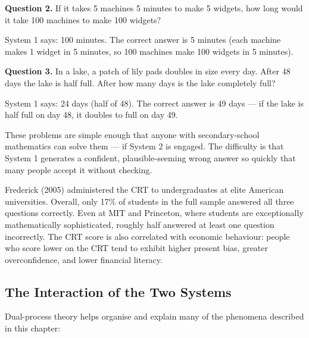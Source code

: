 \documentclass[12pt, letterpaper]{article}
\begin{document}
\textbf{Question 2.} If it takes 5 machines 5 minutes to make 5 widgets, how long would it take 100 machines to make 100 widgets?

System 1 says: 100 minutes. The correct answer is 5 minutes (each machine makes 1 widget in 5 minutes, so 100 machines make 100 widgets in 5 minutes).

\textbf{Question 3.} In a lake, a patch of lily pads doubles in size every day. After 48 days the lake is half full. After how many days is the lake completely full?

System 1 says: 24 days (half of 48). The correct answer is 49 days --- if the lake is half full on day 48, it doubles to full on day 49.

These problems are simple enough that anyone with secondary-school mathematics can solve them --- if System 2 is engaged. The difficulty is that System 1 generates a confident, plausible-seeming wrong answer so quickly that many people accept it without checking.

Frederick (2005) administered the CRT to undergraduates at elite American universities. Overall, only 17\% of students in the full sample answered all three questions correctly. Even at MIT and Princeton, where students are exceptionally mathematically sophisticated, roughly half answered at least one question incorrectly. The CRT score is also correlated with economic behaviour: people who score lower on the CRT tend to exhibit higher present bias, greater overconfidence, and lower financial literacy.

\medskip


\subsection{The Interaction of the Two Systems}


Dual-process theory helps organise and explain many of the phenomena described in this chapter:
\end{document}
